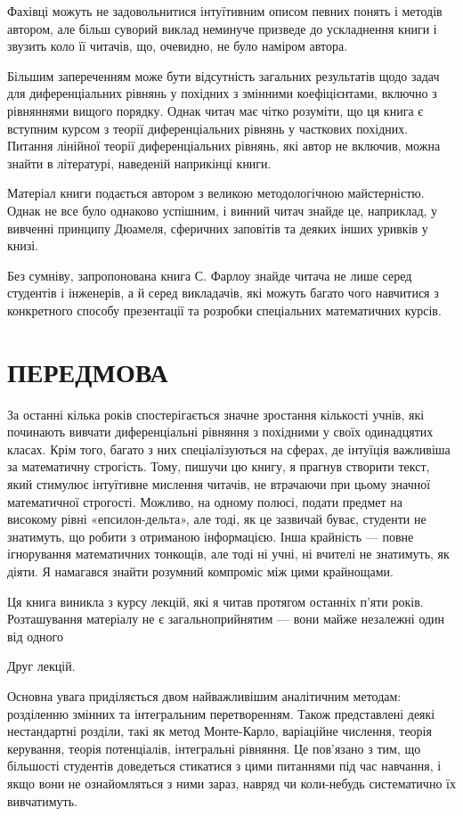 Фахівці можуть не задовольнитися інтуїтивним описом певних понять і методів автором, але більш суворий виклад неминуче призведе до ускладнення книги і звузить коло її читачів, що, очевидно, не було наміром автора.

Більшим запереченням може бути відсутність загальних результатів щодо задач для диференціальних рівнянь у похідних з змінними коефіцієнтами, включно з рівняннями вищого порядку. Однак читач має чітко розуміти, що ця книга є вступним курсом з теорії диференціальних рівнянь у часткових похідних. Питання лінійної теорії диференціальних рівнянь, які автор не включив, можна знайти в літературі, наведеній наприкінці книги.

Матеріал книги подається автором з великою методологічною майстерністю. Однак не все було однаково успішним, і винний читач знайде це, наприклад, у вивченні принципу Дюамеля, сферичних заповітів та деяких інших уривків у книзі.

Без сумніву, запропонована книга С. Фарлоу знайде читача не лише серед студентів і інженерів, а й серед викладачів, які можуть багато чого навчитися з конкретного способу презентації та розробки спеціальних математичних курсів.

\section{ПЕРЕДМОВА}\label{ux43fux435ux440ux435ux434ux43cux43eux432ux430}

За останні кілька років спостерігається значне зростання кількості учнів, які починають вивчати диференціальні рівняння з похідними у своїх одинадцятих класах. Крім того, багато з них спеціалізуються на сферах, де інтуїція важливіша за математичну строгість. Тому, пишучи цю книгу, я прагнув створити текст, який стимулює інтуїтивне мислення читачів, не втрачаючи при цьому значної математичної строгості. Можливо, на одному полюсі, подати предмет на високому рівні «епсилон-дельта», але тоді, як це зазвичай буває, студенти не знатимуть, що робити з отриманою інформацією. Інша крайність --- повне ігнорування математичних тонкощів, але тоді ні учні, ні вчителі не знатимуть, як діяти. Я намагався знайти розумний компроміс між цими крайнощами.

Ця книга виникла з курсу лекцій, які я читав протягом останніх п'яти років. Розташування матеріалу не є загальноприйнятим --- вони майже незалежні один від одного

Друг лекцій.

Основна увага приділяється двом найважливішим аналітичним методам: розділенню змінних та інтегральним перетворенням. Також представлені деякі нестандартні розділи, такі як метод Монте-Карло, варіаційне числення, теорія керування, теорія потенціалів, інтегральні рівняння. Це пов'язано з тим, що більшості студентів доведеться стикатися з цими питаннями під час навчання, і якщо вони не ознайомляться з ними зараз, навряд чи коли-небудь систематично їх вивчатимуть.

